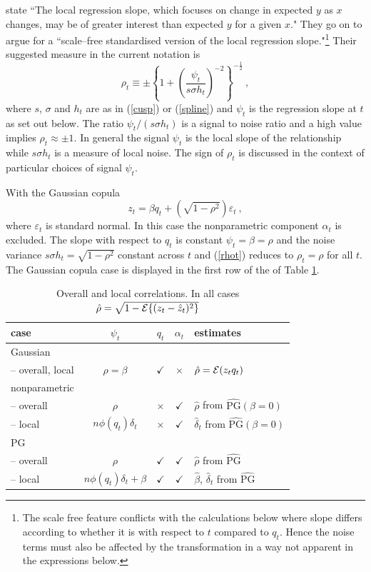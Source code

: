 \documentclass[authoryear]{elsarticle}
\newcommand{\Ex}{{\cal E}}
\newcommand{\eref}[1]{(\ref{#1})}
\newcommand{\tref}[1]{Table \ref{#1}}
\newcommand{\be}[1]{\begin{equation}\label{#1}}
\newcommand{\ee}{\end{equation}}
\begin{document}
\cite{bjerve1993correlation} state ``The local regression slope, which focuses on change in expected $y$ as $x$ changes, may be of greater interest than expected  $y$ for a given $x$." They go on to argue for  a  ``scale--free standardised version of the local regression slope."\footnote{The scale free feature conflicts with the calculations below where  slope differs according to whether it is with respect to $t$ compared to $q_t$.  Hence the noise terms must also be affected by the transformation in a way not apparent in the expressions below.} Their suggested measure  in  the current notation is 
\be{rhot}
 \rho_t\equiv\pm\left\{1+\left(\frac{\psi_t}{s\sigma h_t}\right)^{-2}\right\}^{-\frac{1}{2}}\ ,
\ee
where $s$, $\sigma$ and $h_t$ are as in \eref{cusp} or \eref{spline} and $\psi_t$ is the regression slope at $t$ as set out below.  The ratio $\psi_t/(s\sigma h_t)$ is a signal to noise ratio and a high value implies $\rho_t\approx \pm 1$.    In general the signal  $\psi_t$ is the local slope of the relationship while $s\sigma h_t$ is a measure of local noise.   The sign of $\rho_t$ is discussed in the context of particular choices of signal $\psi_t$.  

With the Gaussian copula 
$$
z_t=\beta q_t + (\sqrt{1-\rho^2})\varepsilon_t\ ,
$$
where $\varepsilon_t$ is standard normal.  In this  case the nonparametric component $\alpha_t$ is excluded.  The slope with respect to $q_t$ is constant $\psi_t=\beta=\rho$ and the noise variance $s\sigma h_t=\sqrt{1-\rho^2}$ constant across $t$ and \eref{rhot} reduces to $\rho_t=\rho$ for all $t$.  The Gaussian copula case is displayed in the first row of the of \tref{corr}.

\begin{table}[htdp]
\caption{Overall and local correlations.  In all cases $\hat\rho=\sqrt{1-\Ex\{(z_t-\hat z_t)^2\}}$}\label{corr}
\begin{center}
\begin{tabular}{l|ccc|l}
\hline
case & $\psi_t$ & $q_t$ & $\alpha_t$ & estimates\\
\hline\hline
Gaussian & & & \\
-- overall,  local &$\rho=\beta$ &$\checkmark$& $\times$ & $\hat\rho=\Ex(z_tq_t)$ \\
\hline
nonparametric & & & \\
-- overall &$\rho$ &$\times$ & $\checkmark$& $\hat\rho$ from $\widehat{\mathrm{PG}}(\beta=0)$\\
-- local  &$n\phi(q_t)\delta_t$ &$\times$ & $\checkmark$& $\hat\delta_t$ from $\widehat{\mathrm{PG}}(\beta=0)$\\
\hline
PG & & & \\
-- overall & $\rho$ & $\checkmark$& $\checkmark$& $\hat\rho$ from $\widehat{\mathrm{PG}}$ \\
-- local & $n\phi(q_t)\delta_t+\beta$&$\checkmark$& $\checkmark$&$\hat\beta$, $\hat\delta_t$ from $\widehat{\mathrm{PG}}$  \\
\hline\hline
\end{tabular}
\end{center}
\end{table}%
\end{document}
